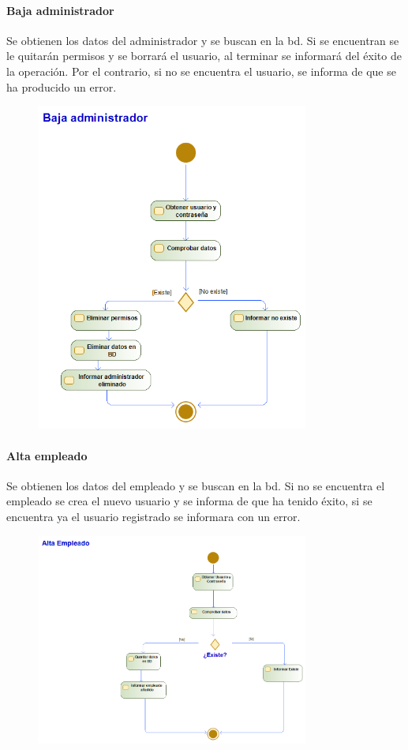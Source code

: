 \paragraph{Baja administrador}
Se obtienen los datos del administrador y se buscan en la \gls{bd}. Si se encuentran se le quitarán permisos y se borrará el usuario, al terminar se informará del éxito de la operación. Por el contrario, si no se encuentra el usuario, se informa  de que se ha producido un error.
\begin{figure}[H]
    \centering
    \includegraphics[width=0.8\textwidth]{Use_Cases/baja_admin.png}
\end{figure}
\paragraph{Alta empleado}
Se obtienen los datos del empleado y se buscan en la \gls{bd}. Si no se encuentra el empleado se crea el nuevo usuario y se informa de que ha tenido éxito, si se encuentra ya el usuario registrado se informara con un error.
\begin{figure}[H]
    \centering
    \includegraphics[width=0.8\textwidth]{Use_Cases/Alta_empleado.png}
\end{figure}

